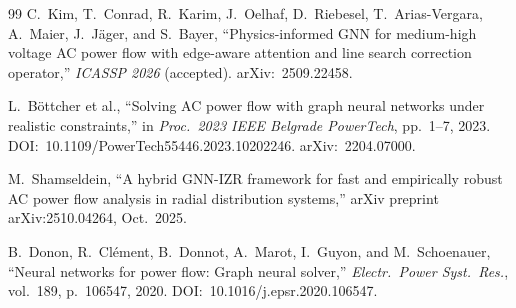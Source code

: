 \documentclass[11pt]{article}
\begin{document}
\begin{thebibliography}{99}
C.~Kim, T.~Conrad, R.~Karim, J.~Oelhaf, D.~Riebesel, T.~Arias-Vergara,
A.~Maier, J.~J\"{a}ger, and S.~Bayer,
``Physics-informed GNN for medium-high voltage AC power flow with edge-aware
attention and line search correction operator,''
\textit{ICASSP 2026} (accepted).
arXiv:~2509.22458.

L.~B\"{o}ttcher et al.,
``Solving AC power flow with graph neural networks under realistic
constraints,''
in \textit{Proc.\ 2023 IEEE Belgrade PowerTech}, pp.~1--7, 2023.
DOI:~10.1109/PowerTech55446.2023.10202246.
arXiv:~2204.07000.

M.~Shamseldein,
``A hybrid GNN-IZR framework for fast and empirically robust AC power flow
analysis in radial distribution systems,''
arXiv preprint arXiv:2510.04264, Oct.\ 2025.

B.~Donon, R.~Clément, B.~Donnot, A.~Marot, I.~Guyon, and M.~Schoenauer,
``Neural networks for power flow: Graph neural solver,''
\textit{Electr.\ Power Syst.\ Res.}, vol.~189, p.~106547, 2020.
DOI:~10.1016/j.epsr.2020.106547.

\end{thebibliography}
\end{document}
